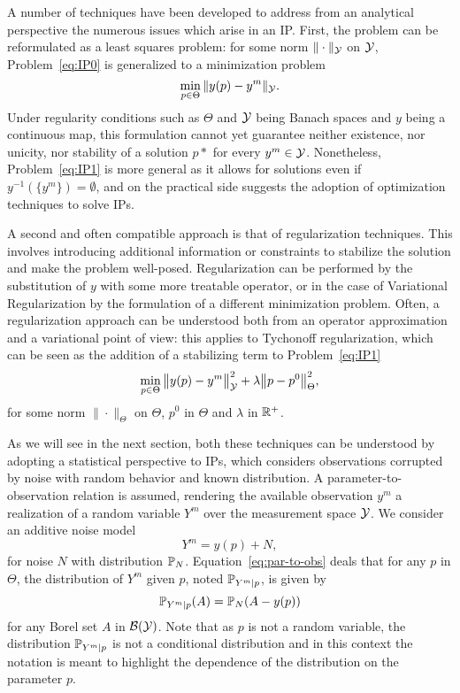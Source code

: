 A number of techniques have been developed to address from an analytical perspective the numerous issues which arise in an IP.
First, the problem can be reformulated as a least squares problem: for some norm $\| \cdot \| _\mathcal Y$ on $\mathcal Y$, Problem~\ref{eq:IP0} is generalized to a minimization problem
\begin{equation}\label{eq:IP1}
    \min_{p\in \Theta} \| y(p) - y^m \|_\mathcal Y.
\end{equation}
Under regularity conditions such as $\Theta$ and $\mathcal Y$ being Banach spaces and $y$ being a continuous map, this formulation cannot yet guarantee neither existence, nor unicity, nor stability of a solution $p*$ for every $y^m \in \mathcal Y$. Nonetheless, Problem~\ref{eq:IP1} is more general as it allows for solutions even if $y^{-1}(\{y^m\} )= \emptyset$, and on the practical side suggests the adoption of optimization techniques to solve IPs.

A second and often compatible approach is that of regularization techniques. 
This involves introducing additional information or constraints to stabilize the solution and make the problem well-posed. Regularization can be performed by the substitution of $y$ with some more treatable operator, or in the case of Variational Regularization by the formulation of a different minimization problem. 
Often, a regularization approach can be understood both from an operator approximation and a variational point of view: this applies to Tychonoff regularization, which can be seen as the addition of a stabilizing term to Problem~\ref{eq:IP1}
\begin{equation}\label{eq:Tycho}
    \min_{p\in \Theta} \big\| y(p) - y^m \big\|_\mathcal Y^2 + \lambda\big\| p - p^0 \big\|_\Theta^2,
\end{equation}
for some norm $\|\cdot\|_\Theta$ on $\Theta$, $p^0$ in $\Theta$ and $\lambda $ in $ \mathbb{R}^+$. \medskip

As we will see in the next section, both these techniques can be understood by adopting a statistical perspective to IPs, which considers observations corrupted by noise with random behavior and known distribution.
A parameter-to-observation relation is assumed, rendering the available observation $y^m$ a realization of a random variable $Y^m$ over the measurement space $\mathcal Y$.
We consider an additive noise model
\begin{equation}\label{eq:par-to-obs}
    Y^m = y(p) + N,
\end{equation}
for noise $N$ with distribution $\mathbb P _N$. \newline
Equation~\eqref{eq:par-to-obs} deals that for any $p$ in $\Theta$, the distribution of $Y^m$ given $p$, noted $\mathbb P_{Y^m \mid p}$, is given by 
\[
    \mathbb P_{Y^m \mid p} (A) = \mathbb P_N (A-y(p))
\]
for any Borel set $A$ in $\mathcal B (\mathcal Y)$. 
Note that as $p$ is not a random variable, the distribution $\mathbb P_{Y^m \mid p}$ is not a conditional distribution and in this context the notation is meant to highlight the dependence of the distribution on the parameter $p$. \medskip

